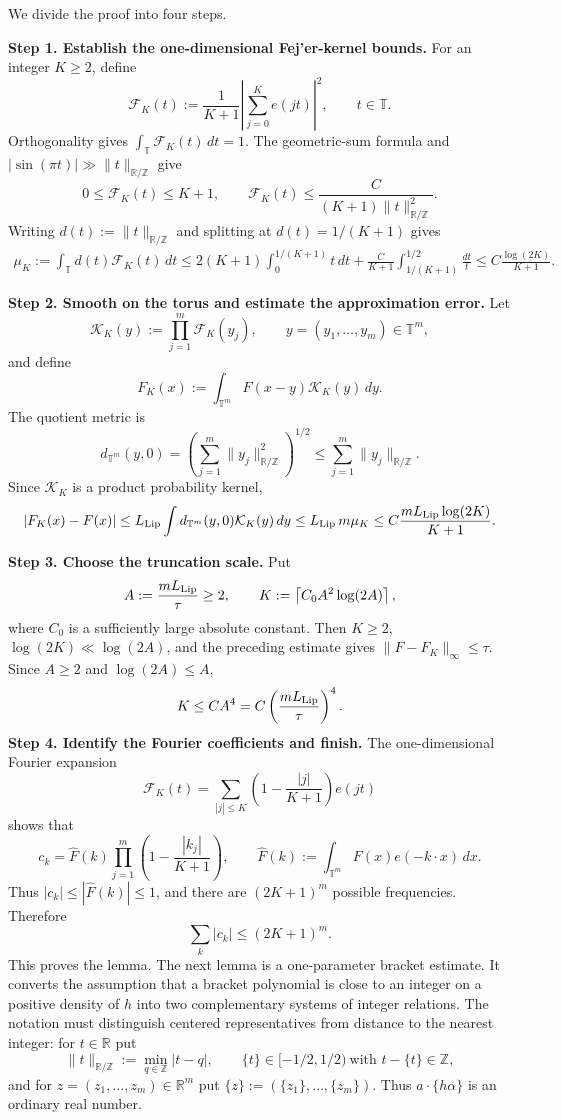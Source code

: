 \documentclass[twoside]{aomart}
\makeatletter
\theoremstyle{paperplain}
\theoremstyle{paperdefinition}
\renewenvironment{proof}[1][\proofname]{\par\pushQED{\qed}%
  \normalfont\topsep6\p@\@plus3\p@\relax\trivlist
  \item[\hskip\labelsep\itshape #1\@addpunct{.}]\ignorespaces
}{\popQED\endtrivlist\@endpefalse}
\numberwithin{equation}{section}
\makeatother
\begin{document}
\begin{proof}
We divide the proof into four steps.

\medskip
\noindent\textbf{Step 1. Establish the one-dimensional Fej'er-kernel bounds.}
For an integer $K\ge2$, define
\[
 \mathcal F_K(t):=\frac1{K+1}\left|\sum_{j=0}^K e(jt)\right|^2,
 \qquad t\in\mathbb T.
\]
Orthogonality gives $\int_{\mathbb T}\mathcal F_K(t)\,dt=1$.  The
geometric-sum formula and $|\sin(\pi t)|\gg\|t\|_{\mathbb R/\mathbb Z}$ give
\[
 0\le\mathcal F_K(t)\le K+1,
 \qquad
 \mathcal F_K(t)\le
 \frac{C}{(K+1)\|t\|_{\mathbb R/\mathbb Z}^2}.
\]
Writing $d(t):=\|t\|_{\mathbb R/\mathbb Z}$ and splitting at
$d(t)=1/(K+1)$ gives
\begin{align*}
 \mu_K:=\int_{\mathbb T}d(t)\mathcal F_K(t)\,dt
 \le2(K+1)\int_0^{1/(K+1)}t\,dt
   +\frac{C}{K+1}\int_{1/(K+1)}^{1/2}\frac{dt}{t}
 \le C\frac{\log(2K)}{K+1}.
\end{align*}

\medskip
\noindent\textbf{Step 2. Smooth on the torus and estimate the approximation error.}
Let
\[
 \mathcal K_K(y):=\prod_{j=1}^m\mathcal F_K(y_j),
 \qquad y=(y_1,\ldots,y_m)\in\mathbb T^m,
\]
and define
\[
 F_K(x):=\int_{\mathbb T^m}F(x-y)\mathcal K_K(y)\,dy.
\]
The quotient metric is
\[
 d_{\mathbb T^m}(y,0)
 =\left(\sum_{j=1}^m\|y_j\|_{\mathbb R/\mathbb Z}^2\right)^{1/2}
 \le\sum_{j=1}^m\|y_j\|_{\mathbb R/\mathbb Z}.
\]
Since $\mathcal K_K$ is a product probability kernel,
\begin{align*}
 |F_K(x)-F(x)|
 \le L_{\rm Lip}\int d_{\mathbb T^m}(y,0)\mathcal K_K(y)\,dy
 \le L_{\rm Lip}\,m\mu_K
 \le C\frac{mL_{\rm Lip}\log(2K)}{K+1}.
\end{align*}

\medskip
\noindent\textbf{Step 3. Choose the truncation scale.}
Put
\[
 A:=\frac{mL_{\rm Lip}}{\tau}\ge2,
 \qquad K:=\left\lceil C_0A^2\log(2A)\right\rceil,
\]
where $C_0$ is a sufficiently large absolute constant.  Then
$K\ge2$, $\log(2K)\ll\log(2A)$, and the preceding estimate gives
$\|F-F_K\|_\infty\le\tau$.  Since $A\ge2$ and $\log(2A)\le A$,
\[
 K\le C A^4=C\left(\frac{mL_{\rm Lip}}{\tau}\right)^4.
\]
\medskip
\noindent\textbf{Step 4. Identify the Fourier coefficients and finish.}
The one-dimensional Fourier expansion
\[
 \mathcal F_K(t)=\sum_{|j|\le K}
 \left(1-\frac{|j|}{K+1}\right)e(jt)
\]
shows that
\[
 c_k=\widehat F(k)\prod_{j=1}^m
 \left(1-\frac{|k_j|}{K+1}\right),
 \qquad
 \widehat F(k):=\int_{\mathbb T^m}F(x)e(-k\cdot x)\,dx.
\]
Thus $|c_k|\le|\widehat F(k)|\le1$, and there are $(2K+1)^m$
possible frequencies.  Therefore
\[
 \sum_k|c_k|\le(2K+1)^m.
\]
This proves the lemma.
\end{proof}
The next lemma is a one-parameter bracket estimate.  It converts the
assumption that a bracket polynomial is close to an integer on a positive
density of $h$ into two complementary systems of integer relations.  The
notation must distinguish centered representatives from distance to the
nearest integer: for $t\in\mathbb R$ put
\[
 \|t\|_{\mathbb R/\mathbb Z}:=\min_{q\in\mathbb Z}|t-q|,
 \qquad \{t\}\in[-1/2,1/2)\ \text{with }t-\{t\}\in\mathbb Z,
\]
and for $z=(z_1,\ldots,z_m)\in\mathbb R^m$ put
$\{z\}:=(\{z_1\},\ldots,\{z_m\})$.  Thus
$a\cdot\{h\alpha\}$ is an ordinary real number.
\end{document}
